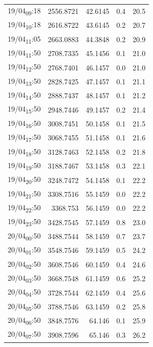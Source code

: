 \documentclass[11pt]{article}
\begin{document}
\begin{center}
\begin{tabular}{lrrrr}
19/04\textsubscript{09}:18 & 2556.8721 & 42.6145 & 0.4 & 20.5\\[0pt]
19/04\textsubscript{10}:18 & 2616.8722 & 43.6145 & 0.2 & 20.7\\[0pt]
19/04\textsubscript{11}:05 & 2663.0883 & 44.3848 & 0.2 & 20.9\\[0pt]
19/04\textsubscript{11}:50 & 2708.7335 & 45.1456 & 0.1 & 21.0\\[0pt]
19/04\textsubscript{12}:50 & 2768.7401 & 46.1457 & 0.0 & 21.0\\[0pt]
19/04\textsubscript{13}:50 & 2828.7425 & 47.1457 & 0.1 & 21.1\\[0pt]
19/04\textsubscript{14}:50 & 2888.7437 & 48.1457 & 0.1 & 21.2\\[0pt]
19/04\textsubscript{15}:50 & 2948.7446 & 49.1457 & 0.2 & 21.4\\[0pt]
19/04\textsubscript{16}:50 & 3008.7451 & 50.1458 & 0.1 & 21.5\\[0pt]
19/04\textsubscript{17}:50 & 3068.7455 & 51.1458 & 0.1 & 21.6\\[0pt]
19/04\textsubscript{18}:50 & 3128.7463 & 52.1458 & 0.2 & 21.8\\[0pt]
19/04\textsubscript{19}:50 & 3188.7467 & 53.1458 & 0.3 & 22.1\\[0pt]
19/04\textsubscript{20}:50 & 3248.7472 & 54.1458 & 0.1 & 22.2\\[0pt]
19/04\textsubscript{21}:50 & 3308.7516 & 55.1459 & 0.0 & 22.2\\[0pt]
19/04\textsubscript{22}:50 & 3368.753 & 56.1459 & 0.0 & 22.2\\[0pt]
19/04\textsubscript{23}:50 & 3428.7545 & 57.1459 & 0.8 & 23.0\\[0pt]
20/04\textsubscript{00}:50 & 3488.7544 & 58.1459 & 0.7 & 23.7\\[0pt]
20/04\textsubscript{01}:50 & 3548.7546 & 59.1459 & 0.5 & 24.2\\[0pt]
20/04\textsubscript{02}:50 & 3608.7546 & 60.1459 & 0.4 & 24.6\\[0pt]
20/04\textsubscript{03}:50 & 3668.7548 & 61.1459 & 0.6 & 25.2\\[0pt]
20/04\textsubscript{04}:50 & 3728.7544 & 62.1459 & 0.4 & 25.6\\[0pt]
20/04\textsubscript{05}:50 & 3788.7546 & 63.1459 & 0.2 & 25.8\\[0pt]
20/04\textsubscript{06}:50 & 3848.7576 & 64.146 & 0.1 & 25.9\\[0pt]
20/04\textsubscript{07}:50 & 3908.7596 & 65.146 & 0.3 & 26.2\\[0pt]

\end{tabular}
\end{center}
\end{document}
